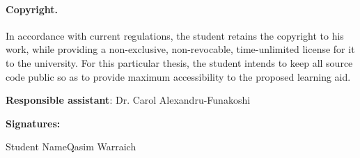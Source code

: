 \documentclass{task_description}
\begin{document}
\paragraph{Copyright.}
In accordance with current regulations, the student retains the copyright to his work, while providing a non-exclusive, non-revocable, time-unlimited license for it to the university. For this particular thesis, the student intends to keep all source code public so as to provide maximum accessibility to the proposed learning aid. 

\vspace{2em}
\noindent\textbf{Responsible assistant}: Dr. Carol Alexandru-Funakoshi

\vspace{2em}
\noindent\textbf{Signatures:}

\vspace{3\baselineskip}
\noindent Student Name\hfill Qasim Warraich
\vspace{2cm}


\end{document}
